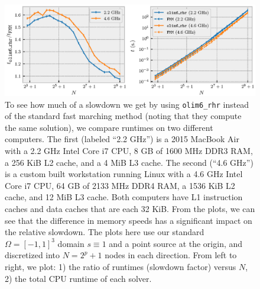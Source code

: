 \documentclass[sisc-eikonal.tex]{subfiles}
\begin{document}
\begin{figure}
  \centering \includegraphics[width=\linewidth]{speed-comparison.eps}%
  \vspace{-1.5em}
  \caption{
    To see how much of a slowdown we get by using \texttt{olim6\_rhr}
    instead of the standard fast marching method (noting that they
    compute the same solution), we compare runtimes on two different
    computers. The first (labeled ``2.2 GHz'') is a 2015 MacBook Air
    with a 2.2 GHz Intel Core i7 CPU, 8 GB of 1600 MHz DDR3 RAM, a 256
    KiB L2 cache, and a 4 MiB L3 cache. The second (``4.6 GHz'') is a
    custom built workstation running Linux with a 4.6 GHz Intel Core
    i7 CPU, 64 GB of 2133 MHz DDR4 RAM, a 1536 KiB L2 cache, and 12
    MiB L3 cache. Both computers have L1 instruction caches and data
    caches that are each 32 KiB. From the plots, we can see that the
    difference in memory speeds has a significant impact on the
    relative slowdown. The plots here use our standard
    $\Omega = [-1, 1]^3$ domain $s \equiv 1$ and a point source at the
    origin, and discretized into $N = 2^p + 1$ nodes in each
    direction. From left to right, we plot: 1) the ratio of runtimes
    (slowdown factor) versus $N$, 2) the total CPU runtime of each solver.
  }\label{fig:speed-comparison}
\end{figure}
\end{document}
